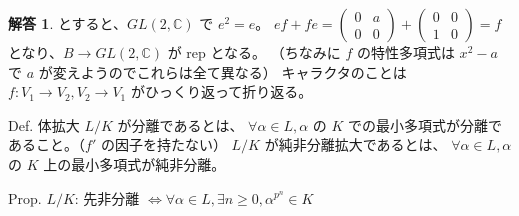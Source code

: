 \documentclass[12pt]{jlreq}
\theoremstyle{definition}
\newtheorem*{solution}{解答}
\begin{document}
\begin{solution}
とすると、$GL(2, \mathbb{C})$ で $e^2 = e$。
$ef + fe = \begin{pmatrix} 0 & a \\ 0 & 0 \end{pmatrix} + \begin{pmatrix} 0 & 0 \\ 1 & 0 \end{pmatrix} = f$
となり、$B \to GL(2, \mathbb{C})$ が rep となる。
（ちなみに $f$ の特性多項式は $x^2 - a$ で $a$ が変えようのでこれらは全て異なる）
キャラクタのことは $f: V_1 \to V_2, V_2 \to V_1$ がひっくり返って折り返る。

Def. 体拡大 $L/K$ が分離であるとは、
$\forall \alpha \in L, \alpha$ の $K$ での最小多項式が分離であること。（$f'$ の因子を持たない）
$L/K$ が純非分離拡大であるとは、
$\forall \alpha \in L, \alpha$ の $K$ 上の最小多項式が純非分離。

Prop.
$L/K$: 先非分離 $\iff \forall \alpha \in L, \exists n \ge 0, \alpha^{p^n} \in K$
\end{solution}
\end{document}
